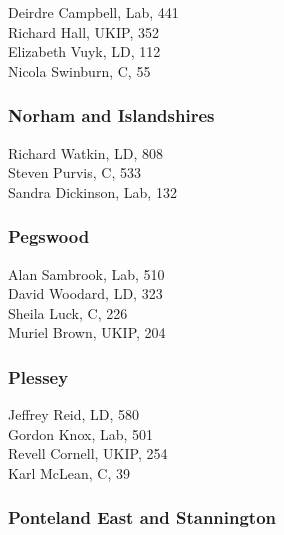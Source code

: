 \documentclass[a4paper,openany,10pt]{book}
\begin{document}


Deirdre Campbell, Lab, 441\\
Richard Hall, UKIP, 352\\
Elizabeth Vuyk, LD, 112\\
Nicola Swinburn, C, 55\\


\subsubsection*{Norham and Islandshires}



Richard Watkin, LD, 808\\
Steven Purvis, C, 533\\
Sandra Dickinson, Lab, 132\\


\subsubsection*{Pegswood}



Alan Sambrook, Lab, 510\\
David Woodard, LD, 323\\
Sheila Luck, C, 226\\
Muriel Brown, UKIP, 204\\


\subsubsection*{Plessey}



Jeffrey Reid, LD, 580\\
Gordon Knox, Lab, 501\\
Revell Cornell, UKIP, 254\\
Karl McLean, C, 39\\


\subsubsection*{Ponteland East and Stannington}

\end{document}
